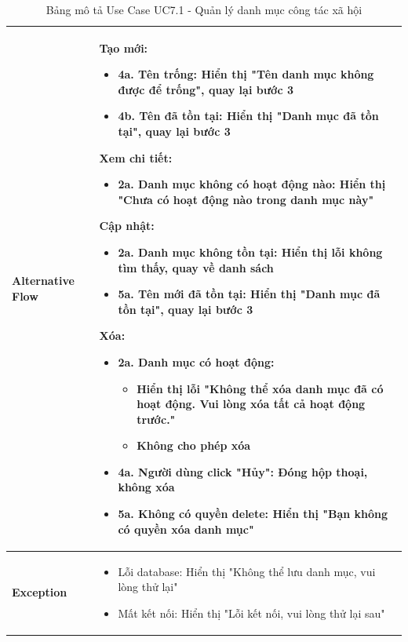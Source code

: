    \newpage
    \begin{table}[H]
    \renewcommand{\arraystretch}{1.3}
    \begin{tabular}{|m{}|m{}|}
    \hline
    \textbf{Alternative Flow} 
    & \textbf{Tạo mới:}
    \begin{itemize}
        \item \textbf{4a.} Tên trống: Hiển thị "Tên danh mục không được để trống", quay lại bước 3
        \item \textbf{4b.} Tên đã tồn tại: Hiển thị "Danh mục đã tồn tại", quay lại bước 3
    \end{itemize}

    \textbf{Xem chi tiết:}
    \begin{itemize}
        \item \textbf{2a.} Danh mục không có hoạt động nào: Hiển thị "Chưa có hoạt động nào trong danh mục này"
    \end{itemize}

    \textbf{Cập nhật:}
    \begin{itemize}
        \item \textbf{2a.} Danh mục không tồn tại: Hiển thị lỗi không tìm thấy, quay về danh sách
        \item \textbf{5a.} Tên mới đã tồn tại: Hiển thị "Danh mục đã tồn tại", quay lại bước 3
    \end{itemize}

    \textbf{Xóa:}
    \begin{itemize}
        \item \textbf{2a.} Danh mục có hoạt động: 
        \begin{itemize}
            \item Hiển thị lỗi "Không thể xóa danh mục đã có hoạt động. Vui lòng xóa tất cả hoạt động trước."
            \item Không cho phép xóa
        \end{itemize}
        \item \textbf{4a.} Người dùng click "Hủy": Đóng hộp thoại, không xóa
        \item \textbf{5a.} Không có quyền delete: Hiển thị "Bạn không có quyền xóa danh mục"
    \end{itemize}
    \\ \hline

    \textbf{Exception} 
    & \begin{itemize}
        \item Lỗi database: Hiển thị "Không thể lưu danh mục, vui lòng thử lại"
        \item Mất kết nối: Hiển thị "Lỗi kết nối, vui lòng thử lại sau"
    \end{itemize}
    \\ \hline
    \end{tabular}
    \caption{Bảng mô tả Use Case UC7.1 - Quản lý danh mục công tác xã hội}
    \end{table}

